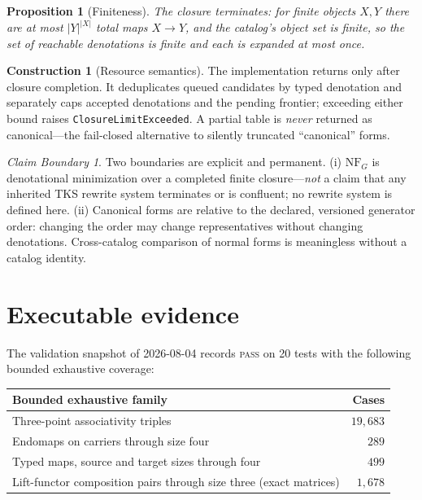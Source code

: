 \documentclass[11pt]{amsart}
\newtheorem{proposition}[theorem]{Proposition}
\theoremstyle{definition}
\newtheorem{construction}[theorem]{Construction}
\theoremstyle{remark}
\newtheorem{boundary}[theorem]{Claim Boundary}
\newcommand{\NF}{\mathrm{NF}}
\begin{document}
\begin{proposition}[Finiteness]\label{prop:finite}
The closure terminates: for finite objects $X,Y$ there are at most $|Y|^{|X|}$ total maps $X\to Y$, and the catalog's object set is finite, so the set of reachable denotations is finite and each is expanded at most once.
\end{proposition}

\begin{construction}[Resource semantics]\label{con:resources}
The implementation returns only after closure completion. It deduplicates queued candidates by typed denotation and separately caps accepted denotations and the pending frontier; exceeding either bound raises \texttt{ClosureLimitExceeded}. A partial table is \emph{never} returned as canonical---the fail-closed alternative to silently truncated ``canonical'' forms.
\end{construction}

\begin{boundary}
Two boundaries are explicit and permanent. (i) $\NF_G$ is denotational minimization over a completed finite closure---\emph{not} a claim that any inherited TKS rewrite system terminates or is confluent; no rewrite system is defined here. (ii) Canonical forms are relative to the declared, versioned generator order: changing the order may change representatives without changing denotations. Cross-catalog comparison of normal forms is meaningless without a catalog identity.
\end{boundary}

\section{Executable evidence}\label{sec:evidence}

The validation snapshot of 2026-08-04 records \textsc{pass} on 20 tests with the following bounded exhaustive coverage:

\begin{center}
\begin{tabular}{@{}lr@{}}
\toprule
Bounded exhaustive family & Cases \\
\midrule
Three-point associativity triples & $19{,}683$ \\
Endomaps on carriers through size four & $289$ \\
Typed maps, source and target sizes through four & $499$ \\
Lift-functor composition pairs through size three (exact matrices) & $1{,}678$ \\
\bottomrule
\end{tabular}
\end{center}
\end{document}
